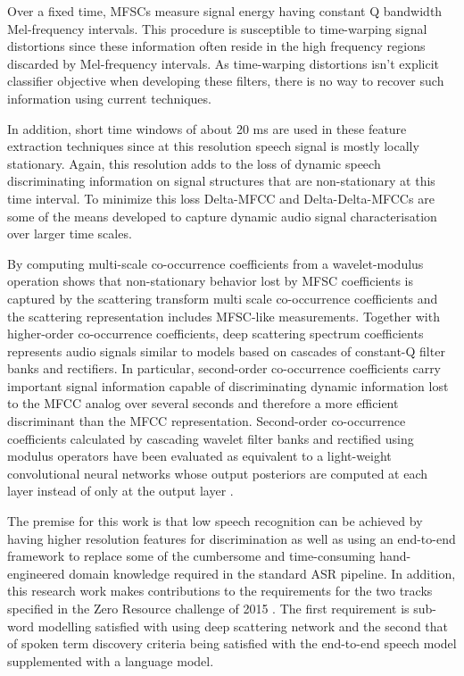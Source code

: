 Over a fixed time, MFSCs measure signal energy having constant Q bandwidth Mel-frequency intervals.  This procedure is susceptible to time-warping signal distortions since these information often reside in the high frequency regions discarded by Mel-frequency intervals.  As time-warping distortions isn't explicit classifier objective when developing these filters, there is no way to recover such information using current techniques. 

In addition, short time windows of about 20 ms are used in these feature extraction techniques since at this resolution speech signal is mostly locally stationary.  Again, this resolution adds to the loss of dynamic speech discriminating information on signal structures that are non-stationary at this time interval. To minimize this loss Delta-MFCC and Delta-Delta-MFCCs \citep{furui1986speaker} are some of the means developed to capture dynamic audio signal characterisation over  larger time scales.

By computing multi-scale co-occurrence coefficients from a wavelet-modulus operation \cite{anden2011multiscale} shows that non-stationary behavior lost by MFSC coefficients is captured by the scattering transform multi scale co-occurrence coefficients and the scattering representation includes MFSC-like measurements.  Together with higher-order co-occurrence coefficients, deep scattering spectrum coefficients represents audio signals similar to  models based on cascades of constant-Q filter banks and rectifiers.  In particular, second-order co-occurrence coefficients carry important  signal information capable of discriminating dynamic information lost to the MFCC analog over several seconds and therefore a more efficient discriminant than the MFCC representation. Second-order co-occurrence coefficients calculated by cascading wavelet filter banks and rectified using modulus operators have been evaluated as equivalent to a light-weight convolutional neural networks whose output posteriors are computed at each layer instead of only at the output layer \cite{mallat2016understanding}.

The premise for this work is that low speech recognition can be achieved by having higher resolution features for discrimination as well as using an end-to-end framework to replace some of the cumbersome and time-consuming hand-engineered domain knowledge required in the standard ASR pipeline.  In addition, this research work makes contributions to the requirements for the two tracks specified in the Zero Resource challenge of 2015 \citep{versteegh2015zero}.  The first requirement is sub-word modelling satisfied with using deep scattering network and the second that of spoken term discovery criteria being satisfied with the end-to-end speech model supplemented with a language model.

